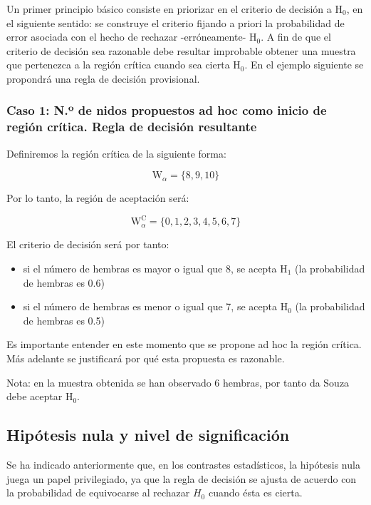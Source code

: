 \documentclass[
]{article}
\providecommand{\tightlist}{%
  \setlength{\itemsep}{0pt}\setlength{\parskip}{0pt}}
\begin{document}
Un primer principio básico consiste en priorizar en el criterio de decisión a \(\mathrm{H}_{0}\), en el siguiente sentido: se construye el criterio fijando a priori la probabilidad de error asociada con el hecho de rechazar -erróneamente- \(\mathrm{H}_{0}\). A fin de que el criterio de decisión sea razonable debe resultar improbable obtener una muestra que pertenezca a la región crítica cuando sea cierta \(\mathrm{H}_{0}\). En el ejemplo siguiente se propondrá una regla de decisión provisional.

\subsubsection{Caso 1: N.º de nidos propuestos ad hoc como inicio de región crítica. Regla de decisión resultante}\label{caso-1-n.uxba-de-nidos-propuestos-ad-hoc-como-inicio-de-regiuxf3n-cruxedtica.-regla-de-decisiuxf3n-resultante}

Definiremos la región crítica de la siguiente forma:

\[
\mathrm{W}_{\alpha}=\{8,9,10\}
\]

Por lo tanto, la región de aceptación será:

\[
\mathrm{W}_{\alpha}^{\mathrm{C}}=\{0,1,2,3,4,5,6,7\}
\]

El criterio de decisión será por tanto:

\begin{itemize}
\tightlist
\item
  si el número de hembras es mayor o igual que 8, se acepta \(\mathrm{H}_{1}\) (la probabilidad de hembras es 0.6)\\
\item
  si el número de hembras es menor o igual que 7, se acepta \(\mathrm{H}_{0}\) (la probabilidad de hembras es 0.5)
\end{itemize}

Es importante entender en este momento que se propone ad hoc la región crítica. Más adelante se justificará por qué esta propuesta es razonable.

Nota: en la muestra obtenida se han observado 6 hembras, por tanto da Souza debe aceptar \(\mathrm{H}_{0}\).

\subsection{Hipótesis nula y nivel de significación}\label{hipuxf3tesis-nula-y-nivel-de-significaciuxf3n}

Se ha indicado anteriormente que, en los contrastes estadísticos, la hipótesis nula juega un papel privilegiado, ya que la regla de decisión se ajusta de acuerdo con la probabilidad de equivocarse al rechazar \(H_{0}\) cuando ésta es cierta.
\end{document}
